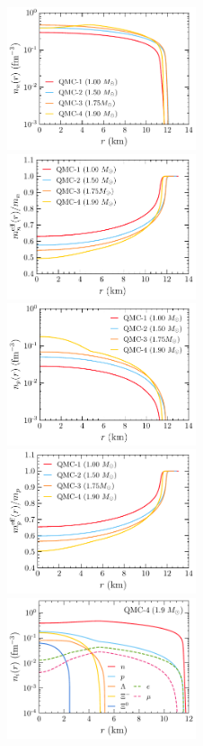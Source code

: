 \begin{figure}[t!bp]
    \centering
    \includegraphics[width=0.495\textwidth]{nn_QMC_profs.pdf}
    \includegraphics[width=0.495\textwidth]{meff_n_QMC_profs.pdf}
    \includegraphics[width=0.495\textwidth]{np_QMC_profs.pdf}
    \includegraphics[width=0.495\textwidth]{meff_p_QMC_profs.pdf}
    \includegraphics[width=0.495\textwidth]{ni_QMC_profs.pdf}

\end{figure}
